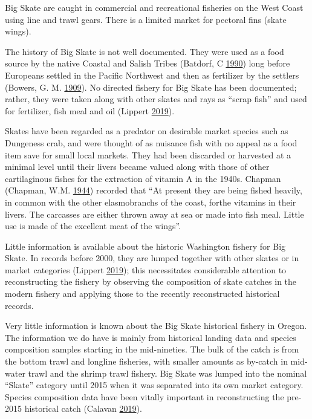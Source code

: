 \documentclass[12pt,]{article}
\begin{document}
Big Skate are caught in commercial and recreational fisheries on the
West Coast using line and trawl gears. There is a limited market for
pectoral fins (skate wings).

The history of Big Skate is not well documented. They were used as a
food source by the native Coastal and Salish Tribes (Batdorf, C
\protect\hyperlink{ref-Batdorf1990}{1990}) long before Europeans settled
in the Pacific Northwest and then as fertilizer by the settlers (Bowers,
G. M. \protect\hyperlink{ref-Bowers1909}{1909}). No directed fishery for
Big Skate has been documented; rather, they were taken along with other
skates and rays as ``scrap fish'' and used for fertilizer, fish meal and
oil (Lippert \protect\hyperlink{ref-GregLippert}{2019}).

Skates have been regarded as a predator on desirable market species such
as Dungeness crab, and were thought of as nuisance fish with no appeal
as a food item save for small local markets. They had been discarded or
harvested at a minimal level until their livers became valued along with
those of other cartilaginous fishes for the extraction of vitamin A in
the 1940s. Chapman (Chapman, W.M.
\protect\hyperlink{ref-Chapman1944}{1944}) recorded that ``At present
they are being fished heavily, in common with the other elasmobranchs of
the coast, forthe vitamins in their livers. The carcasses are either
thrown away at sea or made into fish meal. Little use is made of the
excellent meat of the wings''.

Little information is available about the historic Washington fishery
for Big Skate. In records before 2000, they are lumped together with
other skates or in market categories (Lippert
\protect\hyperlink{ref-GregLippert}{2019}); this necessitates
considerable attention to reconstructing the fishery by observing the
composition of skate catches in the modern fishery and applying those to
the recently reconstructed historical records.

Very little information is known about the Big Skate historical fishery
in Oregon. The information we do have is mainly from historical landing
data and species composition samples starting in the mid-nineties. The
bulk of the catch is from the bottom trawl and longline fisheries, with
smaller amounts as by-catch in mid-water trawl and the shrimp trawl
fishery. Big Skate was lumped into the nominal ``Skate'' category until
2015 when it was separated into its own market category. Species
composition data have been vitally important in reconstructing the
pre-2015 historical catch (Calavan
\protect\hyperlink{ref-TedCalavan}{2019}).
\end{document}
